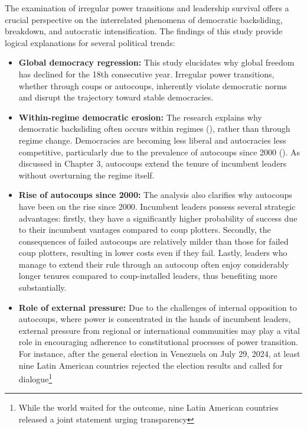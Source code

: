 \documentclass[
  12pt,
]{report}
\begin{document}
The examination of irregular power transitions and leadership survival
offers a crucial perspective on the interrelated phenomena of democratic
backsliding, breakdown, and autocratic intensification. The findings of
this study provide logical explanations for several political trends:

\begin{itemize}
\item
  \textbf{Global democracy regression:} This study elucidates why global
  freedom has declined for the 18th consecutive year. Irregular power
  transitions, whether through coups or autocoups, inherently violate
  democratic norms and disrupt the trajectory toward stable democracies.
\item
  \textbf{Within-regime democratic erosion:} The research explains why
  democratic backsliding often occurs within regimes
  (),
  rather than through regime change. Democracies are becoming less
  liberal and autocracies less competitive, particularly due to the
  prevalence of autocoups since 2000 (). As discussed in Chapter 3, autocoups extend the tenure of
  incumbent leaders without overturning the regime itself.
\item
  \textbf{Rise of autocoups since 2000:} The analysis also clarifies why
  autocoups have been on the rise since 2000. Incumbent leaders possess
  several strategic advantages: firstly, they have a significantly
  higher probability of success due to their incumbent vantages compared
  to coup plotters. Secondly, the consequences of failed autocoups are
  relatively milder than those for failed coup plotters, resulting in
  lower costs even if they fail. Lastly, leaders who manage to extend
  their rule through an autocoup often enjoy considerably longer tenures
  compared to coup-installed leaders, thus benefiting more
  substantially.
\item
  \textbf{Role of external pressure:} Due to the challenges of internal
  opposition to autocoups, where power is concentrated in the hands of
  incumbent leaders, external pressure from regional or international
  communities may play a vital role in encouraging adherence to
  constitutional processes of power transition. For instance, after the
  general election in Venezuela on July 29, 2024, at least nine Latin
  American countries rejected the election results and called for
  dialogue\footnote{While the world waited for the outcome, nine Latin
    American countries released a joint statement urging transparency
}
\end{itemize}
\end{document}

